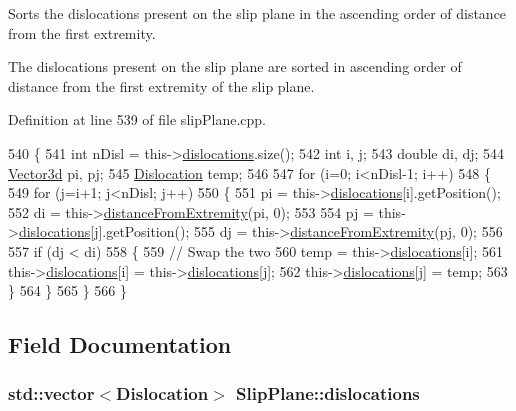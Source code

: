 Sorts the dislocations present on the slip plane in the ascending order of distance from the first extremity. 

The dislocations present on the slip plane are sorted in ascending order of distance from the first extremity of the slip plane. 

Definition at line 539 of file slip\-Plane.\-cpp.


\begin{DoxyCode}
540 \{
541   \textcolor{keywordtype}{int} nDisl = this->\hyperlink{classSlipPlane_ad92c7c409f7e161db449528389180910}{dislocations}.size();
542   \textcolor{keywordtype}{int} i, j;
543   \textcolor{keywordtype}{double} di, dj;
544   \hyperlink{classVector3d}{Vector3d} pi, pj;
545   \hyperlink{classDislocation}{Dislocation} temp;
546 
547   \textcolor{keywordflow}{for} (i=0; i<nDisl-1; i++)
548     \{
549       \textcolor{keywordflow}{for} (j=i+1; j<nDisl; j++)
550         \{
551           pi = this->\hyperlink{classSlipPlane_ad92c7c409f7e161db449528389180910}{dislocations}[i].getPosition();
552           di = this->\hyperlink{classSlipPlane_a3523030cccb520b5253a811d062f3ddf}{distanceFromExtremity}(pi, 0);
553           
554           pj = this->\hyperlink{classSlipPlane_ad92c7c409f7e161db449528389180910}{dislocations}[j].getPosition();
555           dj = this->\hyperlink{classSlipPlane_a3523030cccb520b5253a811d062f3ddf}{distanceFromExtremity}(pj, 0);
556           
557           \textcolor{keywordflow}{if} (dj < di)
558             \{
559               \textcolor{comment}{// Swap the two}
560               temp = this->\hyperlink{classSlipPlane_ad92c7c409f7e161db449528389180910}{dislocations}[i];
561               this->\hyperlink{classSlipPlane_ad92c7c409f7e161db449528389180910}{dislocations}[i] = this->\hyperlink{classSlipPlane_ad92c7c409f7e161db449528389180910}{dislocations}[j];
562               this->\hyperlink{classSlipPlane_ad92c7c409f7e161db449528389180910}{dislocations}[j] = temp;
563             \}
564         \}
565     \}
566 \}
\end{DoxyCode}


\subsection{Field Documentation}
\hypertarget{classSlipPlane_ad92c7c409f7e161db449528389180910}{
\subsubsection[{dislocations}]{\setlength{\rightskip}{0pt plus 5cm}std\-::vector$<${\bf Dislocation}$>$ Slip\-Plane\-::dislocations\hspace{0.3cm}{\ttfamily [protected]}}}\label{db/d25/classSlipPlane_ad92c7c409f7e161db449528389180910}


